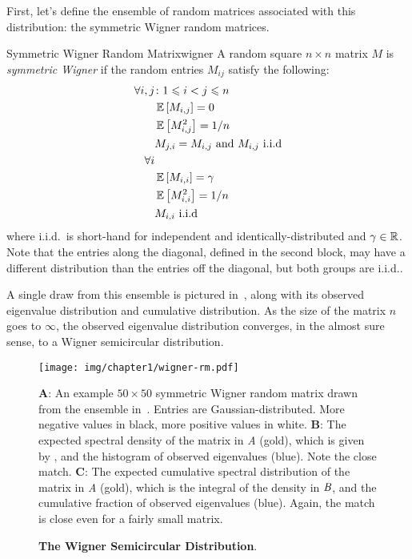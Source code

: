 \documentclass[../../thesis.tex]{subfiles}
\begin{document}
First, let's define the ensemble of random matrices
associated with this distribution:
the symmetric Wigner random matrices.
\begin{definition}{Symmetric Wigner Random Matrix}{wigner}
	A random square $n\times n$ matrix $M$ is \emph{symmetric Wigner}
	if the random entries $M_{ij}$ satisfy the following:
	\begin{align*}
		\forall i,j &\suchthat 1 \leq i < j \leq n\\
			&\Ex{M_{i, j}} = 0\\
			&\Ex{M_{i, j}^2} = 1/n\\
			&M_{j, i} = M_{i, j} \text{\ and\ } M_{i, j} \text{\ i.i.d}\\
		\forall i\\
			&\Ex{M_{i, i}} = \gamma\\
			&\Ex{M_{i, i}^2} = 1/n\\
			&M_{i, i} \text{\ i.i.d}
	\end{align*}
	where i.i.d.~is short-hand for independent
	and identically-distributed
	and $\gamma \in \mathbb{R}$.
	Note that the entries along the diagonal,
	defined in the second block,
	may have a different
	distribution than the entries off the diagonal,
	but both groups are i.i.d..
\end{definition}

A single draw from this ensemble is pictured
in~,
along with its observed eigenvalue distribution
and cumulative distribution.
As the size of the matrix $n$ goes to $\infty$,
the observed eigenvalue distribution converges,
in the almost sure sense,
to a Wigner semicircular distribution.

\begin{figure}[ht]
	\begin{center}
		\texttt{[image: img/chapter1/wigner-rm.pdf]}
	\end{center}
	\caption{\textbf{The Wigner Semicircular Distribution}.}%
	{\textbf{A}: An example $50\times50$ symmetric Wigner random matrix drawn from the ensemble
		in~. Entries are Gaussian-distributed.
		More negative values in black, more positive values in white.
	\textbf{B}: The expected spectral density of the matrix in \emph{A} (gold),
		which is given by ,
		and the histogram of observed eigenvalues (blue). Note the close match.
	\textbf{C}: The expected cumulative spectral distribution
		of the matrix in \emph{A} (gold), which is the integral of the
		density in $\emph{B}$, and the cumulative fraction of observed eigenvalues (blue).
		Again, the match is close even for a fairly small matrix.
}
\end{figure}
\end{document}

